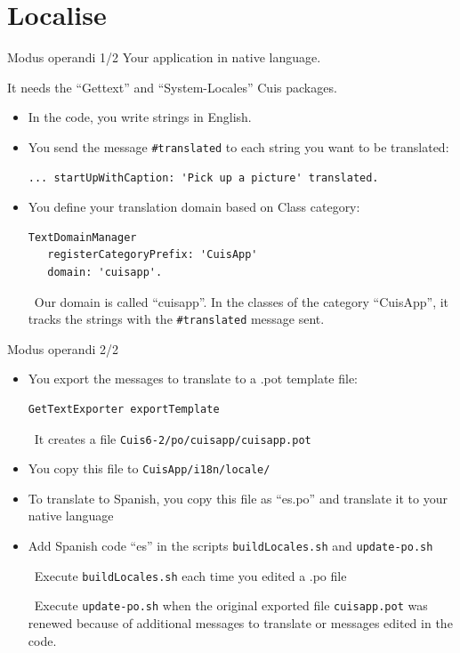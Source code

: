 \documentclass{beamer}
\newcommand{\tip}{\boldmath{\textcolor{red}{$\Rightarrow$}}}
\begin{document}
\section{Localise}
\begin{frame}[fragile]{ Modus operandi 1/2}
\fontsize{10pt}{8pt}\selectfont
Your application in native language.

It needs the ``Gettext'' and ``System-Locales'' Cuis packages.
  \begin{itemize}
  \item In the code, you write strings in English. 
  \item You send the message \texttt{\#translated} to each string you
    want to be translated:
    \begin{lstlisting}[language=Smalltalk]
... startUpWithCaption: 'Pick up a picture' translated.
    \end{lstlisting}
  \item You define your translation domain based on Class category:
    \begin{lstlisting}[language=Smalltalk]
TextDomainManager
   registerCategoryPrefix: 'CuisApp'
   domain: 'cuisapp'.
 \end{lstlisting}
 \tip\ Our domain is called ``cuisapp''. In the classes of the
 category ``CuisApp'', it tracks the strings with the
 \texttt{\#translated} message sent.
 
\end{itemize}
\end{frame}
%
\begin{frame}[fragile]{ Modus operandi 2/2}
  \begin{itemize}
  \item You export the messages to translate to a .pot template file:
    \begin{lstlisting}[language=Smalltalk]
GetTextExporter exportTemplate
\end{lstlisting}
\tip\ It creates a file \texttt{Cuis6-2/po/cuisapp/cuisapp.pot}
\item You copy this file to \texttt{CuisApp/i18n/locale/}
\item To translate to Spanish, you copy this file as ``es.po'' and
  translate it to your native language
\item Add Spanish code ``es'' in the scripts \texttt{buildLocales.sh}
  and \texttt{update-po.sh}
  
  \tip\ Execute \texttt{buildLocales.sh} each time you edited a .po
  file

  \tip\ Execute \texttt{update-po.sh} when the original exported file
  \texttt{cuisapp.pot} was renewed because of additional messages to
  translate or messages edited in the code.
  \end{itemize}
\end{frame}
\end{document}

